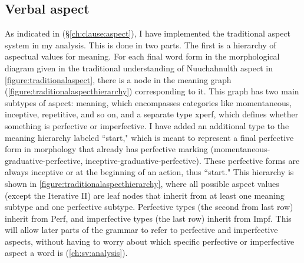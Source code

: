 \subsection{Verbal aspect} \label{ch:clause:analysis:aspect}

As indicated in (\S\ref{ch:clause:aspect}), I have implemented the traditional aspect system in my analysis. This is done in two parts. The first is a hierarchy of aspectual values for meaning. For each final word form in the morphological diagram given in the traditional understanding of Nuuchahnulth aspect in \cref{figure:traditionalaspect}, there is a node in the meaning graph (\cref{figure:traditionalaspecthierarchy}) corresponding to it. This graph has two main subtypes of aspect: meaning, which encompasses categories like momentaneous, inceptive, repetitive, and so on, and a separate type xperf, which defines whether something is perfective or imperfective. I have added an additional type to the meaning hierarchy labeled ``start," which is meant to represent a final perfective form in morphology that already has perfective marking (momentaneous-graduative-perfective, inceptive-graduative-perfective). These perfective forms are always inceptive or at the beginning of an action, thus ``start." This hierarchy is shown in \cref{figure:traditionalaspecthierarchy}, where all possible aspect values (except the Iterative II) are leaf nodes that inherit from at least one meaning subtype and one perfective subtype. Perfective types (the second from last row) inherit from Perf, and imperfective types (the last row) inherit from Impf. This will allow later parts of the grammar to refer to perfective and imperfective aspects, without having to worry about which specific perfective or imperfective aspect a word is (\ref{ch:sv:analysis}).

